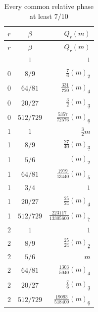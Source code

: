 \documentclass[11pt,letterpaper]{article}
\numberwithin{equation}{section}
\theoremstyle{definition}\newtheorem{definition}[theorem]{Definition}
\theoremstyle{remark}\newtheorem{remark}[theorem]{Remark}
\newcommand{\fall}[2]{(#1)_{\underline{#2}}}
\begin{document}
\renewcommand{\arraystretch}{1.55}
\begin{longtable}{ccr}
\caption{Every common relative phase at least $7/10$\label{det:dia:tab:common}}\\
\toprule $r$&$\beta$&$Q_r(m)$\\\midrule\endfirsthead
\toprule $r$&$\beta$&$Q_r(m)$\\\midrule\endhead
\bottomrule\endfoot
0&$1$&$1$\\
0&$8/9$&$\frac76\fall{m}{2}$\\
0&$64/81$&$\frac{331}{720}\fall{m}{4}$\\
0&$20/27$&$\frac32\fall{m}{3}$\\
0&$512/729$&$\frac{5357}{72576}\fall{m}{6}$\\[3pt]
1&$1$&$\frac32 m$\\
1&$8/9$&$\frac{27}{40}\fall{m}{3}$\\
1&$5/6$&$\fall{m}{2}$\\
1&$64/81$&$\frac{1979}{13440}\fall{m}{5}$\\
1&$3/4$&$1$\\
1&$20/27$&$\frac{25}{24}\fall{m}{4}$\\
1&$512/729$&$\frac{223117}{13305600}\fall{m}{7}$\\[3pt]
2&$1$&$1$\\
2&$8/9$&$\frac{25}{24}\fall{m}{2}$\\
2&$5/6$&$m$\\
2&$64/81$&$\frac{1303}{5040}\fall{m}{4}$\\
2&$20/27$&$\frac76\fall{m}{3}$\\
2&$512/729$&$\frac{19093}{518400}\fall{m}{6}$\\
\end{longtable}
\renewcommand{\arraystretch}{1}
\end{document}
